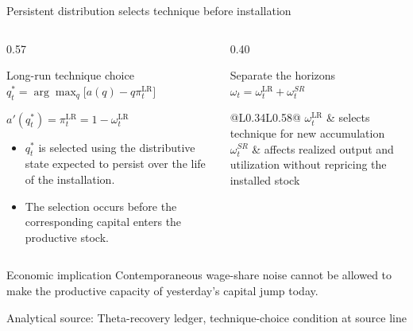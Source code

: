 \documentclass[10pt,aspectratio=169]{beamer}
\newcommand{\LR}{\mathrm{LR}}
\newcommand{\sourcefooter}[1]{%
  \par\vfill{\tiny\color{gray!70}Analytical source: #1}\vspace{-0.35em}}
\begin{document}
\begin{frame}{Persistent distribution selects technique before installation}
  \begin{columns}[T,onlytextwidth]
    \begin{column}{0.57\textwidth}
      \begin{block}{Long-run technique choice}
        \centering
        $\displaystyle
        q_t^*=\arg\max_q\bigl[a(q)-q\pi_t^{\LR}\bigr]$

        \vspace{0.55em}
        \Large $a'(q_t^*)=\pi_t^{\LR}=1-\omega_t^{\LR}$
      \end{block}
      \begin{itemize}\small
        \item $q_t^*$ is selected using the distributive state expected to persist over the life of the installation.
        \item The selection occurs before the corresponding capital enters the productive stock.
      \end{itemize}
    \end{column}
    \begin{column}{0.40\textwidth}
      \begin{block}{Separate the horizons}
        \centering
        $\displaystyle \omega_t=\omega_t^{\LR}+\omega_t^{SR}$
        \vspace{0.3em}

        \begin{tabular}{@{}L{0.34\linewidth}L{0.58\linewidth}@{}}
          $\omega_t^{\LR}$ & selects technique for new accumulation \\
          \addlinespace[0.5em]
          $\omega_t^{SR}$ & affects realized output and utilization without repricing the installed stock
        \end{tabular}
      \end{block}
    \end{column}
  \end{columns}
  \begin{alertblock}{Economic implication}
    Contemporaneous wage-share noise cannot be allowed to make the productive capacity of yesterday's capital jump today.
  \end{alertblock}
  \sourcefooter{Theta-recovery ledger, technique-choice condition at source line \LineTechniqueChoice}
\end{frame}
\end{document}
